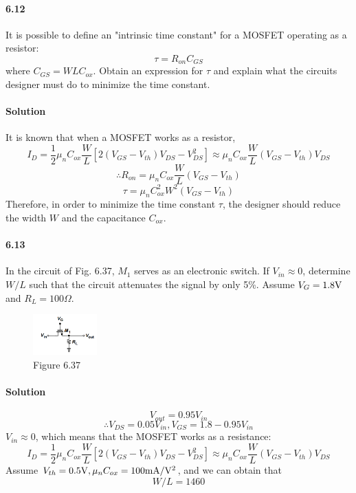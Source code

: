 \documentclass[hyperref, UTF8]{ctexart}
\newcommand{\volt}{{\rm V}}
\newcommand{\milliampere}{{\rm mA}}
\newcommand{\ohm}{\Omega}
\begin{document}
\paragraph{6.12}
It is possible to define an "intrinsic time constant" for a MOSFET operating as a resistor: 
$$\tau = R_{on}C_{GS}$$
where $C_{GS} = WLC_{ox}$. Obtain an expression for $\tau$ and explain what the circuits 
designer must do to minimize the time constant.

\paragraph{Solution}
It is known that when a MOSFET works as a resistor, 
$$
I_D = \frac{1}{2} \mu _n C_{ox} \frac{W}{L} [2(V_{GS} - V_{th}) V_{DS} - V_{DS}^2] 
\approx \mu _n C_{ox} \frac{W}{L} (V_{GS} - V_{th}) V_{DS}
$$
$$
\therefore R_{on} = \mu _n C_{ox} \frac{W}{L} (V_{GS} - V_{th}) 
$$
$$
\tau = \mu_n C_{ox}^2 W^2 (V_{GS} - V_{th})
$$
Therefore, in order to minimize the time constant $\tau$, the designer should reduce the width $W$ 
and the capacitance $C_{ox}$.

\paragraph{6.13}
In the circuit of Fig. 6.37, $M_1$ serves as an electronic switch. If $V_{in} \approx 0$, 
determine $W/L$ such that the circuit attenuates the signal by only 5\%. Assume $V_G=1.8\volt$ and
$R_L = 100 \ohm$.

\begin{figure}[!htb]
    \centering
    \includegraphics[width=0.219\textwidth]{f6-37.png}
    \caption*{Figure 6.37}
\end{figure}    

\paragraph{Solution}
    $$V_{out} = 0.95 V_{in} $$
    $$\therefore V_{DS} = 0.05 V_{in}, V_{GS} = 1.8 - 0.95 V_{in}$$
    $V_{in} \approx 0$, which means that the MOSFET works as a resistance:
    $$I_D = \frac{1}{2} \mu _n C_{ox} \frac{W}{L} [2(V_{GS} - V_{th}) V_{DS} - V_{DS}^2] 
\approx \mu _n C_{ox} \frac{W}{L} (V_{GS} - V_{th}) V_{DS} $$
    Assume $V_{th} = 0.5 \volt, \mu_n C_{ox} = 100 \milliampere / \volt^2$, and we can obtain that 
    $$  W/L = 1460 $$
\end{document}
